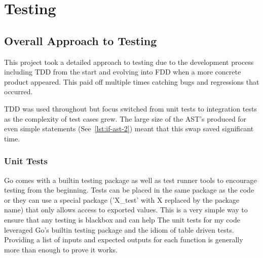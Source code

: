 \chapter{Testing}




\section{Overall Approach to Testing}
This project took a detailed approach to testing due to the development process including TDD from the start and evolving into FDD when a more concrete product appeared.
This paid off multiple times catching bugs and regressions that occurred.

TDD was used throughout but focus switched from unit tests to integration tests as the complexity of test cases grew. 
The large size of the AST's produced for even simple statements (See~\ref{lst:if-ast-2}) meant that this swap saved significant time.

\subsection{Unit Tests}
Go comes with a builtin testing package as well as test runner tools to encourage testing from the beginning.
Tests can be placed in the same package as the code or they can use a special package ('X\_test' with X replaced by the package name) that only allows access to exported values.
This is a very simple way to ensure that any testing is blackbox and can help 
The unit tests for my code leveraged Go's builtin testing package and the idiom of table driven tests.
Providing a list of inputs and expected outputs for each function is generally more than enough to prove it works.


